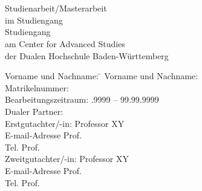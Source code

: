 \begin{titlepage}
\begin{singlespace}
\begin{minipage}{\textwidth}
		\vspace{-2cm}
		\noindent {} \hfill   {}
\end{minipage}
\vspace{1em}
\sffamily
\begin{center}
	\textsf{\textbf{\LARGE{}\DerTitelDerArbeit}} \\[2.5mm]
	\textsf{\textbf{\large{}\DerUntertitelDerArbeit}} \\[1.5cm]
	\textsf{\huge{}Studienarbeit/Masterarbeit}\\[3mm]
	\textsf{\large{}im Studiengang}\\[1.5mm]
	\textsf{\large{}Studiengang}\\[1cm]
	\textsf{\large{}am Center for Advanced Studies}\\[1.5mm]
	\textsf{\large{}der Dualen Hochschule Baden-Württemberg}
	
\vfill

\begin{minipage}{\textwidth}

\begin{tabbing}
	Vorname und Nachname: \hspace{0.85cm}\=\kill
	Vorname und Nachname: \> \DerAutorDerArbeit \\[1.5mm]
	Matrikelnummer:  \\[1.5mm]
	Bearbeitungszeitraum: .9999 -- 99.99.9999 \\[1.5mm]
	Dualer Partner: \> \DerNameDerFirma  \\[1.5mm]
	Erstgutachter/-in: \> Professor XY \\
	\> E-mail-Adresse Prof. \\
	\> Tel. Prof. \\[1.5mm]
	Zweitgutachter/-in: \> Professor XY \\
	\> E-mail-Adresse Prof. \\
	\> Tel. Prof. \\[1.5mm]
\end{tabbing}
\end{minipage}


\end{center}
\end{singlespace}
\end{titlepage}
